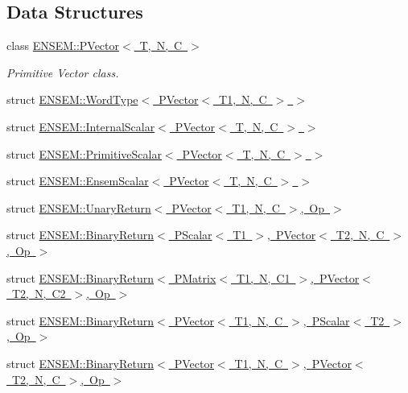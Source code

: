 \subsection*{Data Structures}
\begin{DoxyCompactItemize}
\item 
class \mbox{\hyperlink{classENSEM_1_1PVector}{E\+N\+S\+E\+M\+::\+P\+Vector$<$ T, N, C $>$}}
\begin{DoxyCompactList}\small\item\em Primitive Vector class. \end{DoxyCompactList}\item 
struct \mbox{\hyperlink{structENSEM_1_1WordType_3_01PVector_3_01T1_00_01N_00_01C_01_4_01_4}{E\+N\+S\+E\+M\+::\+Word\+Type$<$ P\+Vector$<$ T1, N, C $>$ $>$}}
\item 
struct \mbox{\hyperlink{structENSEM_1_1InternalScalar_3_01PVector_3_01T_00_01N_00_01C_01_4_01_4}{E\+N\+S\+E\+M\+::\+Internal\+Scalar$<$ P\+Vector$<$ T, N, C $>$ $>$}}
\item 
struct \mbox{\hyperlink{structENSEM_1_1PrimitiveScalar_3_01PVector_3_01T_00_01N_00_01C_01_4_01_4}{E\+N\+S\+E\+M\+::\+Primitive\+Scalar$<$ P\+Vector$<$ T, N, C $>$ $>$}}
\item 
struct \mbox{\hyperlink{structENSEM_1_1EnsemScalar_3_01PVector_3_01T_00_01N_00_01C_01_4_01_4}{E\+N\+S\+E\+M\+::\+Ensem\+Scalar$<$ P\+Vector$<$ T, N, C $>$ $>$}}
\item 
struct \mbox{\hyperlink{structENSEM_1_1UnaryReturn_3_01PVector_3_01T1_00_01N_00_01C_01_4_00_01Op_01_4}{E\+N\+S\+E\+M\+::\+Unary\+Return$<$ P\+Vector$<$ T1, N, C $>$, Op $>$}}
\item 
struct \mbox{\hyperlink{structENSEM_1_1BinaryReturn_3_01PScalar_3_01T1_01_4_00_01PVector_3_01T2_00_01N_00_01C_01_4_00_01Op_01_4}{E\+N\+S\+E\+M\+::\+Binary\+Return$<$ P\+Scalar$<$ T1 $>$, P\+Vector$<$ T2, N, C $>$, Op $>$}}
\item 
struct \mbox{\hyperlink{structENSEM_1_1BinaryReturn_3_01PMatrix_3_01T1_00_01N_00_01C1_01_4_00_01PVector_3_01T2_00_01N_00_01C2_01_4_00_01Op_01_4}{E\+N\+S\+E\+M\+::\+Binary\+Return$<$ P\+Matrix$<$ T1, N, C1 $>$, P\+Vector$<$ T2, N, C2 $>$, Op $>$}}
\item 
struct \mbox{\hyperlink{structENSEM_1_1BinaryReturn_3_01PVector_3_01T1_00_01N_00_01C_01_4_00_01PScalar_3_01T2_01_4_00_01Op_01_4}{E\+N\+S\+E\+M\+::\+Binary\+Return$<$ P\+Vector$<$ T1, N, C $>$, P\+Scalar$<$ T2 $>$, Op $>$}}
\item 
struct \mbox{\hyperlink{structENSEM_1_1BinaryReturn_3_01PVector_3_01T1_00_01N_00_01C_01_4_00_01PVector_3_01T2_00_01N_00_01C_01_4_00_01Op_01_4}{E\+N\+S\+E\+M\+::\+Binary\+Return$<$ P\+Vector$<$ T1, N, C $>$, P\+Vector$<$ T2, N, C $>$, Op $>$}}

\end{DoxyCompactItemize}
